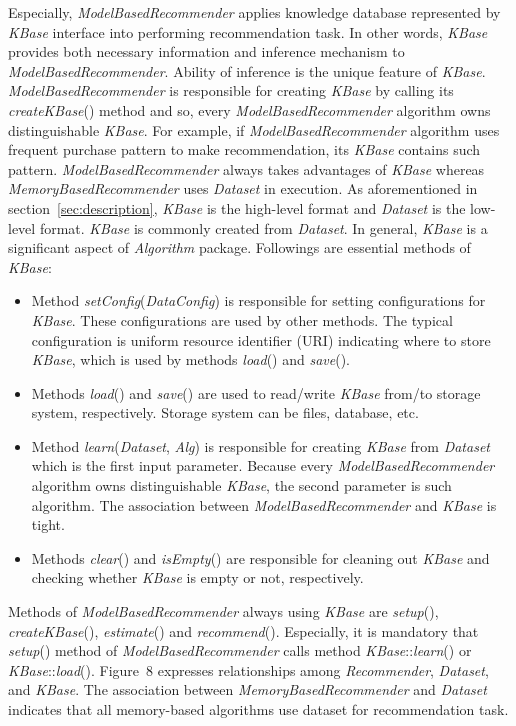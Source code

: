 \documentclass[a4paper]{llncs}
\begin{document}
Especially, \textit{ModelBasedRecommender} applies knowledge database represented by \textit{KBase} interface into performing recommendation task. In other words, \textit{KBase} provides both necessary information and inference mechanism to \textit{ModelBasedRecommender}. Ability of inference is the unique feature of \textit{KBase}. \textit{ModelBasedRecommender} is responsible for creating \textit{KBase} by calling its \textit{createKBase}() method and so, every \textit{ModelBasedRecommender} algorithm owns distinguishable \textit{KBase}. For example, if \textit{ModelBasedRecommender} algorithm uses frequent purchase pattern to make recommendation, its \textit{KBase} contains such pattern. \textit{ModelBasedRecommender} always takes advantages of \textit{KBase} whereas \textit{MemoryBasedRecommender} uses \textit{Dataset} in execution. As aforementioned in section~\ref{sec:description}, \textit{KBase} is the high-level format and \textit{Dataset} is the low-level format. \textit{KBase} is commonly created from \textit{Dataset}. In general, \textit{KBase} is a significant aspect of \textit{Algorithm} package. Followings are essential methods of \textit{KBase}:
\begin{itemize}
\item Method \textit{setConfig}(\textit{DataConfig}) is responsible for setting configurations for \textit{KBase}. These configurations are used by other methods. The typical configuration is uniform resource identifier (URI) indicating where to store \textit{KBase}, which is used by methods \textit{load}() and \textit{save}().
\item Methods \textit{load}() and \textit{save}() are used to read/write \textit{KBase} from/to storage system, respectively. Storage system can be files, database, etc.
\item Method \textit{learn}(\textit{Dataset}, \textit{Alg}) is responsible for creating \textit{KBase} from \textit{Dataset} which is the first input parameter. Because every \textit{ModelBasedRecommender} algorithm owns distinguishable \textit{KBase}, the second parameter is such algorithm. The association between \textit{ModelBasedRecommender} and \textit{KBase} is tight.
\item Methods \textit{clear}() and \textit{isEmpty}() are responsible for cleaning out \textit{KBase} and checking whether \textit{KBase} is empty or not, respectively.
\end{itemize}
Methods of \textit{ModelBasedRecommender} always using \textit{KBase} are \textit{setup}(), \textit{createKBase}(), \textit{estimate}() and \textit{recommend}(). Especially, it is mandatory that \textit{setup}() method of \textit{ModelBasedRecommender} calls method \textit{KBase}::\textit{learn}() or \textit{KBase}::\textit{load}(). Figure~8 expresses relationships among \textit{Recommender}, \textit{Dataset}, and \textit{KBase}. The association between \textit{MemoryBasedRecommender} and \textit{Dataset} indicates that all memory-based algorithms use dataset for recommendation task.
\end{document}
